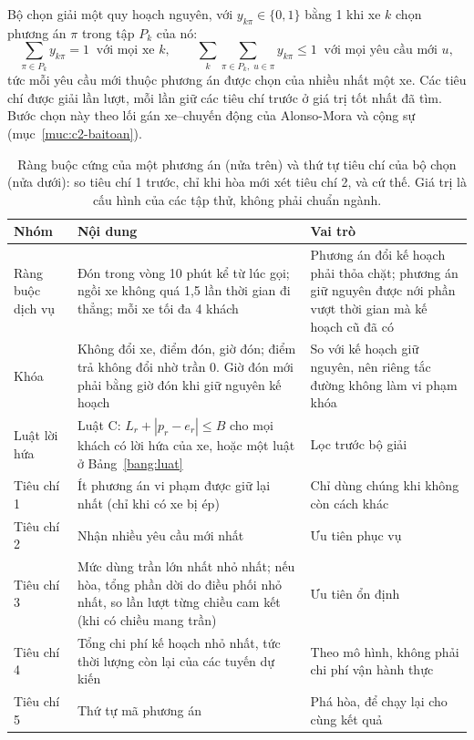 Bộ chọn giải một quy hoạch nguyên, với $y_{k\pi} \in \{0, 1\}$ bằng 1 khi xe $k$ chọn phương án $\pi$ trong
tập $P_k$ của nó:
\begin{equation}
\sum_{\pi \in P_k} y_{k\pi} = 1 \;\;\text{với mọi xe } k, \qquad
\sum_{k} \sum_{\pi \in P_k,\; u \in \pi} y_{k\pi} \le 1 \;\;\text{với mọi yêu cầu mới } u ,
\label{eq:chon}
\end{equation}
tức mỗi yêu cầu mới thuộc phương án được chọn của nhiều nhất một xe. Các tiêu chí được giải lần lượt, mỗi lần giữ
các tiêu chí trước ở giá trị tốt nhất đã tìm. Bước chọn này theo lối gán xe--chuyến động của Alonso-Mora và cộng
sự~\cite{alonsomora2017} (mục~\ref{muc:c2-baitoan}).

\begin{table}[htbp]
\centering
\caption{Ràng buộc cứng của một phương án (nửa trên) và thứ tự tiêu chí của bộ chọn (nửa dưới): so tiêu chí 1
trước, chỉ khi hòa mới xét tiêu chí 2, và cứ thế. Giá trị là cấu hình của các tập thử, không phải chuẩn ngành.}
\label{bang:rangbuoc}
\small
\begin{tabular}{@{}p{2.4cm}p{7.6cm}p{4.8cm}@{}}
\toprule
\textbf{Nhóm} & \textbf{Nội dung} & \textbf{Vai trò}\\
\midrule
Ràng buộc dịch vụ & Đón trong vòng 10 phút kể từ lúc gọi; ngồi xe không quá 1,5 lần thời gian đi thẳng; mỗi
xe tối đa 4 khách & Phương án đổi kế hoạch phải thỏa chặt; phương án giữ nguyên được nới phần vượt thời gian
mà kế hoạch cũ đã có\\
Khóa & Không đổi xe, điểm đón, giờ đón; điểm trả không đổi nhờ trần 0. Giờ đón mới phải bằng giờ đón khi giữ
nguyên kế hoạch & So với kế hoạch giữ nguyên, nên riêng tắc đường không làm vi phạm khóa\\
Luật lời hứa & Luật C: $L_r + |p_r - e_r| \le B$ cho mọi khách có lời hứa của xe, hoặc một luật ở
Bảng~\ref{bang:luat} & Lọc trước bộ giải\\
\midrule
Tiêu chí 1 & Ít phương án vi phạm được giữ lại nhất (chỉ khi có xe bị ép) & Chỉ dùng chúng khi không còn cách
khác\\
Tiêu chí 2 & Nhận nhiều yêu cầu mới nhất & Ưu tiên phục vụ\\
Tiêu chí 3 & Mức dùng trần lớn nhất nhỏ nhất; nếu hòa, tổng phần dời do điều phối nhỏ nhất, so lần lượt từng
chiều cam kết (khi có chiều mang trần) & Ưu tiên ổn định\\
Tiêu chí 4 & Tổng chi phí kế hoạch nhỏ nhất, tức thời lượng còn lại của các tuyến dự kiến & Theo mô hình, không
phải chi phí vận hành thực\\
Tiêu chí 5 & Thứ tự mã phương án & Phá hòa, để chạy lại cho cùng kết quả\\
\bottomrule
\end{tabular}
\end{table}

